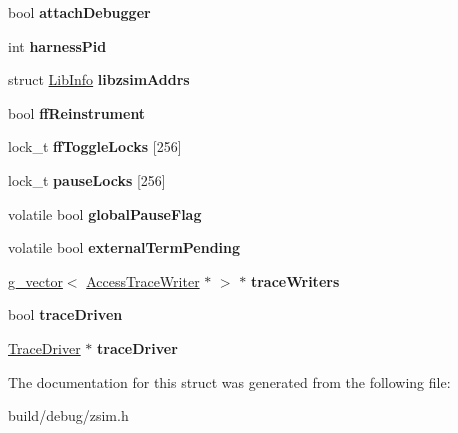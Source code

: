 \begin{DoxyCompactItemize}
\item 
\hypertarget{structGlobSimInfo_a3999e3c24a35a078920112e3e8aa5dab}{bool {\bfseries attach\-Debugger}}\label{structGlobSimInfo_a3999e3c24a35a078920112e3e8aa5dab}

\item 
\hypertarget{structGlobSimInfo_a574a43fdbb86a1c9b4c969c8ae80da5f}{int {\bfseries harness\-Pid}}\label{structGlobSimInfo_a574a43fdbb86a1c9b4c969c8ae80da5f}

\item 
\hypertarget{structGlobSimInfo_a525f0dd999a65c86e2a0cb6b07c109f2}{struct \hyperlink{structLibInfo}{Lib\-Info} {\bfseries libzsim\-Addrs}}\label{structGlobSimInfo_a525f0dd999a65c86e2a0cb6b07c109f2}

\item 
\hypertarget{structGlobSimInfo_a90671c79a157989aae2e21174a4f1c19}{bool {\bfseries ff\-Reinstrument}}\label{structGlobSimInfo_a90671c79a157989aae2e21174a4f1c19}

\item 
\hypertarget{structGlobSimInfo_a5c01542cdfdc3a7811af120be79541e0}{lock\-\_\-t {\bfseries ff\-Toggle\-Locks} \mbox{[}256\mbox{]}}\label{structGlobSimInfo_a5c01542cdfdc3a7811af120be79541e0}

\item 
\hypertarget{structGlobSimInfo_af5c50c671fdf034c36c848c1a413cd69}{lock\-\_\-t {\bfseries pause\-Locks} \mbox{[}256\mbox{]}}\label{structGlobSimInfo_af5c50c671fdf034c36c848c1a413cd69}

\item 
\hypertarget{structGlobSimInfo_aa51f43511c9b596ee95dc780edb5fd20}{volatile bool {\bfseries global\-Pause\-Flag}}\label{structGlobSimInfo_aa51f43511c9b596ee95dc780edb5fd20}

\item 
\hypertarget{structGlobSimInfo_a68da212f97bc9b9716ce1e99b3131a79}{volatile bool {\bfseries external\-Term\-Pending}}\label{structGlobSimInfo_a68da212f97bc9b9716ce1e99b3131a79}

\item 
\hypertarget{structGlobSimInfo_a0e19bc6af551d2ee4b79a78cd48f5050}{\hyperlink{classg__vector}{g\-\_\-vector}$<$ \hyperlink{classAccessTraceWriter}{Access\-Trace\-Writer} $\ast$ $>$ $\ast$ {\bfseries trace\-Writers}}\label{structGlobSimInfo_a0e19bc6af551d2ee4b79a78cd48f5050}

\item 
\hypertarget{structGlobSimInfo_aea28766376bb27d56c605f6f7ec236da}{bool {\bfseries trace\-Driven}}\label{structGlobSimInfo_aea28766376bb27d56c605f6f7ec236da}

\item 
\hypertarget{structGlobSimInfo_a23700bbccdaf9ffb7bcd1bad8300f8c2}{\hyperlink{classTraceDriver}{Trace\-Driver} $\ast$ {\bfseries trace\-Driver}}\label{structGlobSimInfo_a23700bbccdaf9ffb7bcd1bad8300f8c2}

\end{DoxyCompactItemize}


The documentation for this struct was generated from the following file\-:\begin{DoxyCompactItemize}
\item 
build/debug/zsim.\-h\end{DoxyCompactItemize}
